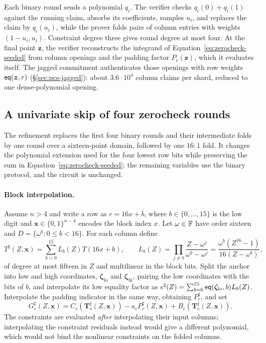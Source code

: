 Each binary round sends a polynomial $q_i$. The verifier checks $q_i(0)+q_i(1)$ against the running claim, absorbs its coefficients, samples $u_i$, and replaces the claim by $q_i(u_i)$, while the prover folds pairs of column entries with weights $(1-u_i,u_i)$. Constraint degree three gives round degree at most four. At the final point $\bm z$, the verifier reconstructs the integrand of Equation~\eqref{eq:zerocheck-seeded} from column openings and the padding factor $P_c(\bm z)$, which it evaluates itself. The jagged commitment authenticates those openings with row weights $\mathsf{eq}(\bm z,r)$ (\S\ref{sec:pcs-jagged}): about $3.6\cdot10^4$ column claims per shard, reduced to one dense-polynomial opening.

\subsection{A univariate skip of four zerocheck rounds}
\label{sec:air-skip}

The refinement replaces the first four binary rounds and their intermediate folds by one round over a sixteen-point domain, followed by one $16{:}1$ fold. It changes the polynomial extension used for the four lowest row bits while preserving the sum in Equation~\eqref{eq:zerocheck-seeded}; the remaining variables use the binary protocol, and the \LogUp{} circuit is unchanged.

\paragraph{Block interpolation.}
Assume $n>4$ and write a row as $r=16x+b$, where $b\in\{0,\ldots,15\}$ is the low digit and $\bm x\in\{0,1\}^{n-4}$ encodes the block index $x$. Let $\omega\in\mathbb{F}$ have order sixteen and $D=\{\omega^b:0\le b<16\}$. For each column define
\begin{equation}
\label{eq:skip-column}
  T^\sharp(Z,\bm x)=\sum_{b=0}^{15}L_b(Z)T(16x+b),
  \qquad
  L_b(Z)=\prod_{j\ne b}\frac{Z-\omega^j}{\omega^b-\omega^j}
        =\frac{\omega^b(Z^{16}-1)}{16(Z-\omega^b)},
\end{equation}
of degree at most fifteen in $Z$ and multilinear in the block bits. Split the anchor into low and high coordinates, $\bm\zeta_{\mathrm{lo}}$ and $\bm\zeta_{\mathrm{hi}}$, pairing the low coordinates with the bits of $b$, and interpolate its low equality factor as $e^\sharp(Z)=\sum_{b=0}^{15}\mathsf{eq}(\bm\zeta_{\mathrm{lo}},b)L_b(Z)$. Interpolate the padding indicator in the same way, obtaining $P_c^\sharp$, and set
\[
  G_c^\sharp(Z,\bm x)
    =C_c(\bm T_c^\sharp(Z,\bm x))-a_cP_c^\sharp(Z,\bm x)
      +B_c(\bm T_c^\sharp(Z,\bm x)).
\]
The constraints are evaluated \emph{after} interpolating their input columns; interpolating the constraint residuals instead would give a different polynomial, which would not bind the nonlinear constraints on the folded columns.

